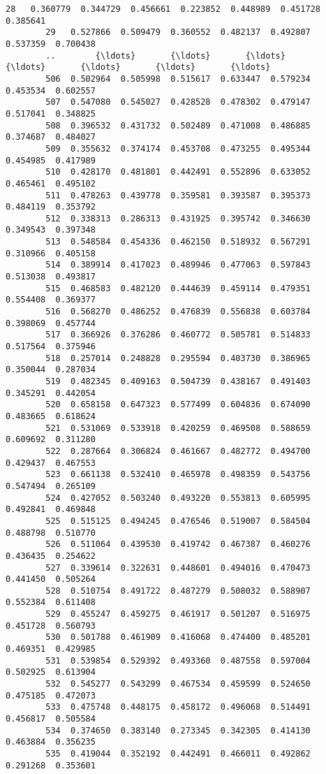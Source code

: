 \documentclass[11pt]{article}
\begin{document}
\begin{Verbatim}[commandchars=\\\{\}]
        28   0.360779  0.344729  0.456661  0.223852  0.448989  0.451728  0.385641   
        29   0.527866  0.509479  0.360552  0.482137  0.492807  0.537359  0.700438   
        ..        {\ldots}       {\ldots}       {\ldots}       {\ldots}       {\ldots}       {\ldots}       {\ldots}   
        506  0.502964  0.505998  0.515617  0.633447  0.579234  0.453534  0.602557   
        507  0.547080  0.545027  0.428528  0.478302  0.479147  0.517041  0.348825   
        508  0.396532  0.431732  0.502489  0.471008  0.486885  0.374687  0.484027   
        509  0.355632  0.374174  0.453708  0.473255  0.495344  0.454985  0.417989   
        510  0.428170  0.481801  0.442491  0.552896  0.633052  0.465461  0.495102   
        511  0.478263  0.439778  0.359581  0.393587  0.395373  0.484119  0.353792   
        512  0.338313  0.286313  0.431925  0.395742  0.346630  0.349543  0.397348   
        513  0.548584  0.454336  0.462150  0.518932  0.567291  0.310966  0.405158   
        514  0.389914  0.417023  0.489946  0.477063  0.597843  0.513038  0.493817   
        515  0.468583  0.482120  0.444639  0.459114  0.479351  0.554408  0.369377   
        516  0.568270  0.486252  0.476839  0.556838  0.603784  0.398069  0.457744   
        517  0.366926  0.376286  0.460772  0.505781  0.514833  0.517564  0.375946   
        518  0.257014  0.248828  0.295594  0.403730  0.386965  0.350044  0.287034   
        519  0.482345  0.409163  0.504739  0.438167  0.491403  0.345291  0.442054   
        520  0.658158  0.647323  0.577499  0.604836  0.674090  0.483665  0.618624   
        521  0.531069  0.533918  0.420259  0.469508  0.588659  0.609692  0.311280   
        522  0.287664  0.306824  0.461667  0.482772  0.494700  0.429437  0.467553   
        523  0.661138  0.532410  0.465978  0.498359  0.543756  0.547494  0.265109   
        524  0.427052  0.503240  0.493220  0.553813  0.605995  0.492841  0.469848   
        525  0.515125  0.494245  0.476546  0.519007  0.584504  0.488798  0.510770   
        526  0.511064  0.439530  0.419742  0.467387  0.460276  0.436435  0.254622   
        527  0.339614  0.322631  0.448601  0.494016  0.470473  0.441450  0.505264   
        528  0.510754  0.491722  0.487279  0.508032  0.588907  0.552384  0.611408   
        529  0.455247  0.459275  0.461917  0.501207  0.516975  0.451728  0.560793   
        530  0.501788  0.461909  0.416068  0.474400  0.485201  0.469351  0.429985   
        531  0.539854  0.529392  0.493360  0.487558  0.597004  0.502925  0.613904   
        532  0.545277  0.543299  0.467534  0.459599  0.524650  0.475185  0.472073   
        533  0.475748  0.448175  0.458172  0.496068  0.514491  0.456817  0.505584   
        534  0.374650  0.383140  0.273345  0.342305  0.414130  0.463884  0.356235   
        535  0.419044  0.352192  0.442491  0.466011  0.492862  0.291268  0.353601   
        

\end{Verbatim}
\end{document}
